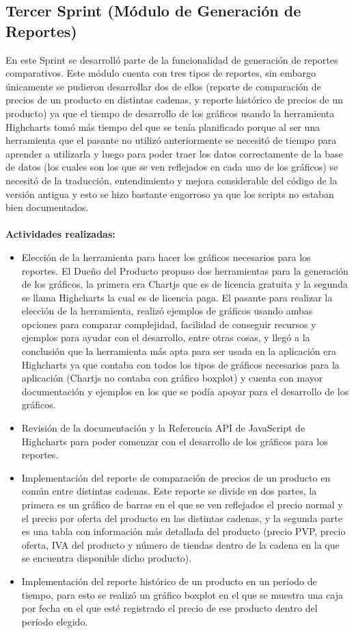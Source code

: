 \subsection{Tercer Sprint (Módulo de Generación de Reportes)}
En este Sprint se desarrolló parte de la funcionalidad de generación de reportes comparativos. Este módulo cuenta con tres tipos de reportes, sin embargo únicamente se pudieron desarrollar dos de ellos (reporte de comparación de precios de un producto en distintas cadenas, y reporte histórico de precios de un producto) ya que el tiempo de desarrollo de los gráficos usando la herramienta Highcharts tomó más tiempo del que se tenía planificado porque al ser una herramienta que el pasante no utilizó anteriormente se necesitó de tiempo para aprender a utilizarla y luego para poder traer los datos correctamente de la base de datos (los cuales son los que se ven reflejados en cada uno de los gráficos) se necesitó de la traducción, entendimiento y mejora considerable del código de la versión antigua y esto se hizo bastante engorroso ya que los scripts no estaban bien documentados.
\\
\\
\textbf{Actividades realizadas:}
\begin{itemize}
   \item Elección de la herramienta para hacer los gráficos necesarios para los reportes. El Dueño del Producto propuso dos herramientas para la generación de los gráficos, la primera era Chartjs que es de licencia gratuita y la segunda se llama Highcharts la cual es de licencia paga. El pasante para realizar la elección de la herramienta, realizó ejemplos de gráficos usando ambas opciones para comparar complejidad, facilidad de conseguir recursos y ejemplos para ayudar con el desarrollo, entre otras cosas, y llegó a la conclusión que la herramienta más apta para ser usada en la aplicación era Highcharts ya que contaba con todos los tipos de gráficos necesarios para la aplicación (Chartjs no contaba con gráfico boxplot) y cuenta con mayor documentación y ejemplos en los que se podía apoyar para el desarrollo de los gráficos. 
   \item Revisión de la documentación y la Referencia API de JavaScript de Highcharts para poder comenzar con el desarrollo de los gráficos para los reportes.
   \item Implementación del reporte de comparación de precios de un producto en común entre distintas cadenas. Este reporte se divide en dos partes, la primera es un gráfico de barras en el que se ven reflejados el precio normal y el precio por oferta del producto en las distintas cadenas, y la segunda parte es una tabla con información más detallada del producto (precio PVP, precio oferta, IVA del producto y número de tiendas dentro de la cadena en la que se encuentra disponible dicho producto).
   \item Implementación del reporte histórico de un producto en un período de tiempo, para esto se realizó un gráfico boxplot en el que se muestra una caja por fecha en el que esté registrado el precio de ese producto dentro del período elegido.
\end{itemize}

